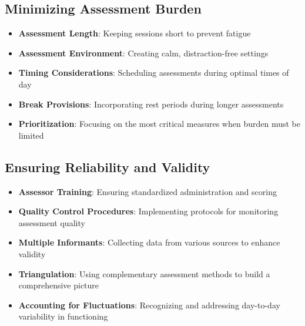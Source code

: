 \subsection{Minimizing Assessment Burden}
\begin{itemize}
    \item \textbf{Assessment Length}: Keeping sessions short to prevent fatigue
    
    \item \textbf{Assessment Environment}: Creating calm, distraction-free settings
    
    \item \textbf{Timing Considerations}: Scheduling assessments during optimal times of day
    
    \item \textbf{Break Provisions}: Incorporating rest periods during longer assessments
    
    \item \textbf{Prioritization}: Focusing on the most critical measures when burden must be limited
\end{itemize}

\subsection{Ensuring Reliability and Validity}
\begin{itemize}
    \item \textbf{Assessor Training}: Ensuring standardized administration and scoring
    
    \item \textbf{Quality Control Procedures}: Implementing protocols for monitoring assessment quality
    
    \item \textbf{Multiple Informants}: Collecting data from various sources to enhance validity
    
    \item \textbf{Triangulation}: Using complementary assessment methods to build a comprehensive picture
    
    \item \textbf{Accounting for Fluctuations}: Recognizing and addressing day-to-day variability in functioning
\end{itemize}